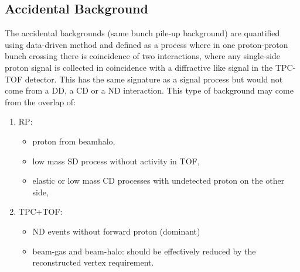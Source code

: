 \subsection{Accidental Background}\label{section:star_accidentals}
The accidental backgrounds (same bunch pile-up background) are quantified using data-driven method and defined as a process where in one proton-proton bunch crossing there is coincidence of two interactions, where any single-side proton signal is collected in coincidence with a diffractive like signal in the TPC-TOF detector. This has the same signature as a signal process but would not come from a DD, a CD or a ND interaction. This type of background may come from the overlap of:
\begin{enumerate}
	\item RP:
	\begin{itemize}
		\item proton from beamhalo,
		\item low mass SD process without activity in TOF,
		\item elastic or low mass CD processes with undetected proton on the other side,
	\end{itemize}
	\item TPC+TOF:
	\begin{itemize}
		\item  ND events without forward proton (dominant)
		\item beam-gas and beam-halo:  should be effectively reduced by the reconstructed vertex requirement.
	\end{itemize}
\end{enumerate}

